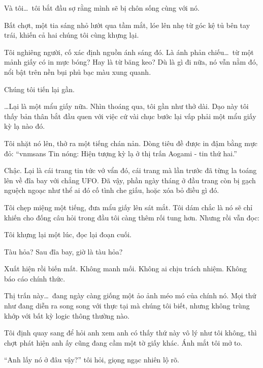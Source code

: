 \documentclass[../main.tex]{subfiles}
\begin{document}
Và tôi\dots\ tôi bắt đầu sợ rằng mình sẽ bị chôn sống cùng với nó.

Bất chợt, một tia sáng nhỏ lướt qua tầm mắt, lóe lên nhẹ từ góc kệ tủ bên tay trái, khiến cả hai chúng tôi cùng khựng lại.

Tôi nghiêng người, cố xác định nguồn ánh sáng đó. Là ánh phản chiếu\dots\ từ một mảnh giấy có in mực bóng? Hay là từ băng keo? Dù là gì đi nữa, nó vẫn nằm đó, nổi bật trên nền bụi phủ bạc màu xung quanh.

Chúng tôi tiến lại gần.

\dots Lại là một mẩu giấy nữa. Nhìn thoáng qua, tôi gần như thở dài. Dạo này tôi thấy bản thân bắt đầu quen với việc cứ vài chục bước lại vấp phải một mẩu giấy kỳ lạ nào đó.

Tôi nhặt nó lên, thở ra một tiếng chán nản. Dòng tiêu đề được in đậm bằng mực đỏ: ``{vnmsans Tin nóng: Hiện tượng kỳ lạ ở thị trấn Aogami - tin thứ hai.}''

Chậc. Lại là cái trang tin tức vớ vẩn đó, cái trang mà lần trước đã từng la toáng lên về đĩa bay với chẳng UFO. Đã vậy, phần ngày tháng ở đầu trang còn bị gạch nguệch ngoạc như thể ai đó cố tình che giấu, hoặc xóa bỏ điều gì đó.

Tôi chẹp miệng một tiếng, đưa mẩu giấy lên sát mắt. Tôi dám chắc là nó sẽ chỉ khiến cho đống câu hỏi trong đầu tôi càng thêm rối tung hơn. Nhưng rồi vẫn đọc:


Tôi khựng lại một lúc, đọc lại đoạn cuối.

Tàu hỏa? Sau đĩa bay, giờ là tàu hỏa?

Xuất hiện rồi biến mất. Không manh mối. Không ai chịu trách nhiệm. Không báo cáo chính thức.

Thị trấn này\dots\ đang ngày càng giống một ảo ảnh méo mó của chính nó. Mọi thứ như đang diễn ra song song với thực tại mà chúng tôi biết, nhưng không trùng khớp với bất kỳ logic thông thường nào.

Tôi định quay sang để hỏi anh xem anh có thấy thứ này vô lý như tôi không, thì chợt phát hiện anh ấy cũng đang cầm một tờ giấy khác. Ánh mắt tôi mở to.

``Anh lấy nó ở đâu vậy?'' tôi hỏi, giọng ngạc nhiên lộ rõ.
\end{document}
